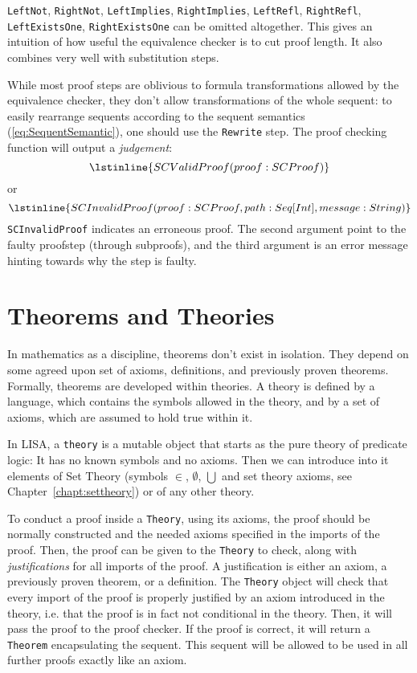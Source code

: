 \texttt{LeftNot}, \texttt{RightNot}, \texttt{LeftImplies}, \texttt{RightImplies}, \texttt{LeftRefl}, \texttt{RightRefl}, \texttt{LeftExistsOne},  \texttt{RightExistsOne}  can be omitted altogether. This gives an intuition of how useful the equivalence checker is to cut proof length. It also combines very well with substitution steps.

While most proof steps are oblivious to formula transformations allowed by the equivalence checker, they don't allow transformations of the whole sequent: to easily rearrange sequents according to the sequent semantics (\ref{eq:SequentSemantic}), one should use the \texttt{Rewrite} step.
The proof checking function will output a \textit{judgement}:
$$\lstinline{SCValidProof(proof: SCProof)}$$
or
$$\lstinline{SCInvalidProof(proof: SCProof, path: Seq[Int], message: String)}$$
\lstinline{SCInvalidProof}{} indicates an erroneous proof. The second argument point to the faulty proofstep (through subproofs), and the third argument is an error message hinting towards why the step is faulty.


\section{Theorems and Theories}
\label{sect:TheoremsAndTheories}
In mathematics as a discipline, theorems don't exist in isolation. They depend on some agreed upon set of axioms, definitions, and previously proven theorems. Formally, theorems are developed within theories. A theory is defined by a language, which contains the symbols allowed in the theory, and by a set of axioms, which are assumed to hold true within it.

In LISA, a \lstinline{theory}{} is a mutable object that starts as the pure theory of predicate logic: It has no known symbols and no axioms. Then we can introduce into it elements of Set Theory (symbols $\in$, $\emptyset$, $\bigcup$ and set theory axioms, see Chapter~\ref{chapt:settheory}) or of any other theory.

To conduct a proof inside a \lstinline{Theory}{}, using its axioms, the proof should be normally constructed and the needed axioms specified in the imports of the proof. Then, the proof can be given to the \lstinline{Theory}{} to check, along with \textit{justifications} for all imports of the proof. A justification is either an axiom, a previously proven theorem, or a definition. The \lstinline{Theory}{} object will check that every import of the proof is properly justified by an axiom introduced in the theory, i.e. that the proof is in fact not conditional in the theory. Then, it will pass the proof to the proof checker. If the proof is correct, it will return a \lstinline{Theorem}{} encapsulating the sequent. This sequent will be allowed to be used in all further proofs exactly like an axiom.


